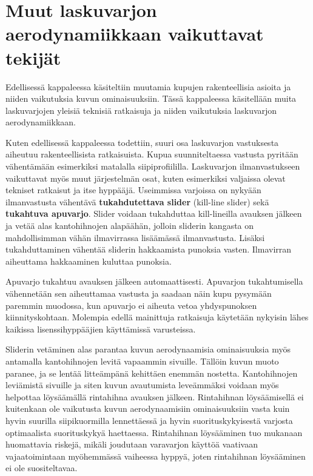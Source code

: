 \section{ Muut laskuvarjon aerodynamiikkaan vaikuttavat tekijät }
\label{varjon-ominaisuudet-muut-laskuvarjon-aerodynamiikkaan-vaikuttavat-tekijat}


Edellisessä kappaleessa käsiteltiin muutamia kupujen rakenteellisia asioita ja niiden vaikutuksia kuvun ominaisuuksiin. Tässä kappaleessa käsitellään muita laskuvarjojen yleisiä teknisiä ratkaisuja ja niiden vaikutuksia laskuvarjon aerodynamiikkaan. 


Kuten edellisessä kappaleessa todettiin, suuri osa laskuvarjon vastuksesta aiheutuu rakenteellisista ratkaisuista. Kupua suunniteltaessa vastusta pyritään vähentämään esimerkiksi matalalla siipiprofiililla. Laskuvarjon ilmanvastukseen vaikuttavat myös muut järjestelmän osat, kuten esimerkiksi valjaissa olevat tekniset ratkaisut ja itse hyppääjä. Useimmissa varjoissa on nykyään ilmanvastusta vähentävä \textbf{tukahdutettava slider} (kill-line slider) sekä \textbf{tukahtuva apuvarjo}. Slider voidaan tukahduttaa kill-lineilla avauksen jälkeen ja vetää alas kantohihnojen alapäähän, jolloin sliderin kangasta on mahdollisimman vähän ilmavirrassa lisäämässä ilmanvastusta. Lisäksi tukahduttaminen vähentää sliderin hakkaamista punoksia vasten. Ilmavirran aiheuttama hakkaaminen kuluttaa punoksia.  


Apuvarjo tukahtuu avauksen jälkeen automaattisesti. Apuvarjon tukahtumisella vähennetään sen aiheuttamaa vastusta ja saadaan näin kupu pysymään paremmin muodossa, kun apuvarjo ei aiheuta vetoa yhdyspunoksen kiinnityskohtaan. Molempia edellä mainittuja ratkaisuja käytetään nykyisin lähes kaikissa lisenssihyppääjien käyttämissä varusteissa. 


Sliderin vetäminen alas parantaa kuvun aerodynaamisia ominaisuuksia myös antamalla kantohihnojen levitä vapaammin sivuille. Tällöin kuvun muoto paranee, ja se lentää litteämpänä kehittäen enemmän nostetta. Kantohihnojen leviämistä sivuille ja siten kuvun avautumista leveämmäksi voidaan myös helpottaa löysäämällä rintahihna avauksen jälkeen. Rintahihnan löysäämisellä ei kuitenkaan ole vaikutusta kuvun aerodynaamisiin ominaisuuksiin vasta kuin hyvin suurilla siipikuormilla lennettäessä ja hyvin suorituskykyisestä varjosta optimaalista suorituskykyä haettaessa. Rintahihnan löysääminen tuo mukanaan huomattavia riskejä, mikäli joudutaan varavarjon käyttöä vaativaan vajaatoimintaan myöhemmässä vaiheessa hyppyä, joten rintahihnan löysääminen ei ole suositeltavaa.  


